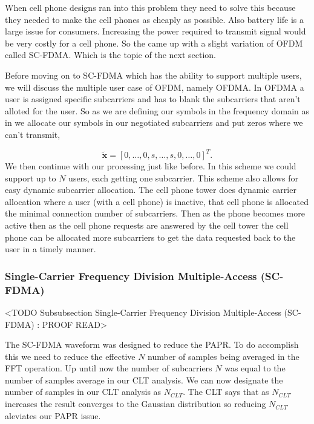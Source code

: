 When cell phone designs ran into this problem they need to solve this because they needed to make the cell phones as cheaply as possible. Also battery life is a large issue for consumers. Increasing the power required to transmit signal would be very costly for a cell phone. So the came up with a slight variation of \ac{OFDM} called \ac{SC-FDMA}. Which is the topic of the next section.

Before moving on to \ac{SC-FDMA} which has the ability to support multiple users, we will discuss the multiple user case of \ac{OFDM}, namely \ac{OFDMA}. In \ac{OFDMA} a user is assigned specific subcarriers and has to blank the subcarriers that aren't alloted for the user. So as we are defining our symbols in the frequency domain as in  we allocate our symbols in our negotiated subcarriers and put zeros where we can't transmit,

\begin{equation}
\tilde{\mathbf{x}}=\left[0,\dots,0,s,\dots,s,0,\dots,0\right]^T.
\end{equation}
\noindent
We then continue with our processing just like before. In this scheme we could support up to $N$ users, each getting one subcarrier. This scheme also allows for easy dynamic subcarrier allocation. The cell phone tower does dynamic carrier allocation where a user (with a cell phone) is inactive, that cell phone is allocated the minimal connection number of subcarriers. Then as the phone becomes more active then as the cell phone requests are answered by the cell tower the cell phone can be allocated more subcarriers to get the data requested back to the user in a timely manner. 
	
\subsubsection{Single-Carrier Frequency Division Multiple-Access (SC-FDMA)}
	<TODO Subsubsection  Single-Carrier Frequency Division Multiple-Access (SC-FDMA) : PROOF READ>

The \ac{SC-FDMA} waveform was designed to reduce the \ac{PAPR}. To do accomplish this we need to reduce the effective $N$ number of samples being averaged in the \ac{FFT} operation. Up until now the number of subcarriers $N$ was equal to the number of samples average in our \ac{CLT} analysis. We can now designate the number of samples in our \ac{CLT} analysis as $N_{CLT}$. The \ac{CLT} says that as $N_{CLT}$ increases the result converges to the Gaussian distribution so reducing $N_{CLT}$ aleviates our \ac{PAPR} issue.

